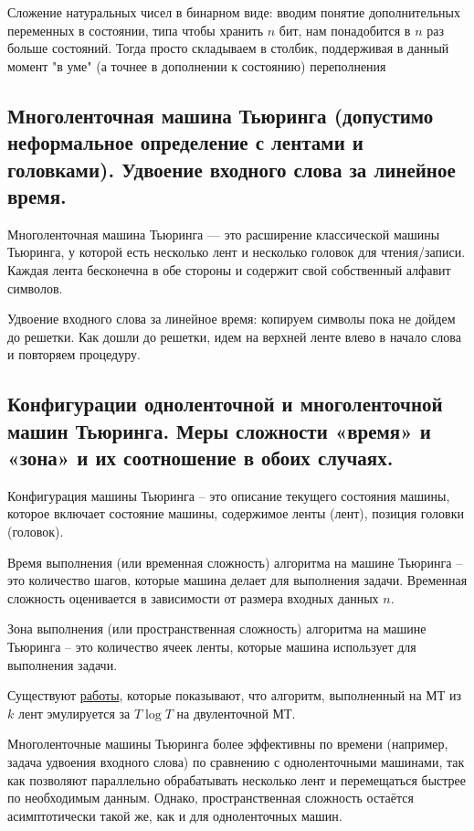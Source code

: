 \documentclass[a4paper, 10pt]{article}
\begin{document}
Сложение натуральных чисел в бинарном виде: вводим понятие дополнительных переменных в состоянии, типа чтобы хранить $n$ бит, нам понадобится в $n$ раз больше состояний. Тогда просто складываем в столбик, поддерживая в данный момент "в уме" (а точнее в дополнении к состоянию) переполнения

\subsection{Многоленточная машина Тьюринга (допустимо неформальное определение с лентами и головками). Удвоение входного слова за линейное время.}

Многоленточная машина Тьюринга — это расширение классической машины Тьюринга, у которой есть несколько лент и несколько головок для чтения/записи. Каждая лента бесконечна в обе стороны и содержит свой собственный алфавит символов.

Удвоение входного слова за линейное время: копируем символы пока не дойдем до решетки. Как дошли до решетки, идем на верхней ленте влево в начало слова и повторяем процедуру.

\subsection{Конфигурации одноленточной и многоленточной машин Тьюринга. Меры сложности «время» и «зона» и их соотношение в обоих случаях.}

Конфигурация машины Тьюринга -- это описание текущего состояния машины, которое включает состояние машины, содержимое ленты (лент), позиция головки (головок).

Время выполнения (или временная сложность) алгоритма на машине Тьюринга -- это количество шагов, которые машина делает для выполнения задачи. Временная сложность оценивается в зависимости от размера входных данных $n$.

Зона выполнения (или пространственная сложность) алгоритма на машине Тьюринга -- это количество ячеек ленты, которые машина использует для выполнения задачи.

\hfill

Существуют \href{https://www.cs.bu.edu/faculty/gacs/courses/cs535/papers/HennieStearns66.pdf}{работы}, которые показывают, что алгоритм, выполненный на МТ из $k$ лент эмулируется за $T\log T$ на двуленточной МТ.

Многоленточные машины Тьюринга более эффективны по времени (например, задача удвоения входного слова) по сравнению с одноленточными машинами, так как позволяют параллельно обрабатывать несколько лент и перемещаться быстрее по необходимым данным. Однако, пространственная сложность остаётся асимптотически такой же, как и для одноленточных машин.
\end{document}
